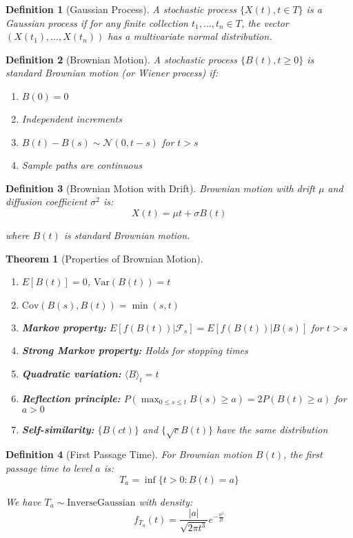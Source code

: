 \documentclass[12pt,a4paper]{article}
\newtheorem{theorem}{Theorem}[section]
\newtheorem{definition}{Definition}[section]
\theoremstyle{remark}
\begin{document}
\begin{definition}[Gaussian Process]
A stochastic process $\{X(t), t \in T\}$ is a Gaussian process if for any finite collection $t_1, \ldots, t_n \in T$, the vector $(X(t_1), \ldots, X(t_n))$ has a multivariate normal distribution.
\end{definition}

\begin{definition}[Brownian Motion]
A stochastic process $\{B(t), t \geq 0\}$ is standard Brownian motion (or Wiener process) if:
\begin{enumerate}
\item $B(0) = 0$
\item Independent increments
\item $B(t) - B(s) \sim \mathcal{N}(0, t-s)$ for $t > s$
\item Sample paths are continuous
\end{enumerate}
\end{definition}

\begin{definition}[Brownian Motion with Drift]
Brownian motion with drift $\mu$ and diffusion coefficient $\sigma^2$ is:
$$X(t) = \mu t + \sigma B(t)$$

where $B(t)$ is standard Brownian motion.
\end{definition}

\begin{theorem}[Properties of Brownian Motion]
\begin{enumerate}
\item $E[B(t)] = 0$, $\text{Var}(B(t)) = t$
\item $\text{Cov}(B(s), B(t)) = \min(s,t)$
\item \textbf{Markov property:} $E[f(B(t)) | \mathcal{F}_s] = E[f(B(t)) | B(s)]$ for $t > s$
\item \textbf{Strong Markov property:} Holds for stopping times
\item \textbf{Quadratic variation:} $\langle B \rangle_t = t$
\item \textbf{Reflection principle:} $P(\max_{0 \leq s \leq t} B(s) \geq a) = 2P(B(t) \geq a)$ for $a > 0$
\item \textbf{Self-similarity:} $\{B(ct)\}$ and $\{\sqrt{c} B(t)\}$ have the same distribution
\end{enumerate}
\end{theorem}

\begin{definition}[First Passage Time]
For Brownian motion $B(t)$, the first passage time to level $a$ is:
$$T_a = \inf\{t > 0: B(t) = a\}$$

We have $T_a \sim \text{InverseGaussian}$ with density:
$$f_{T_a}(t) = \frac{|a|}{\sqrt{2\pi t^3}} e^{-\frac{a^2}{2t}}$$
\end{definition}
\end{document}
